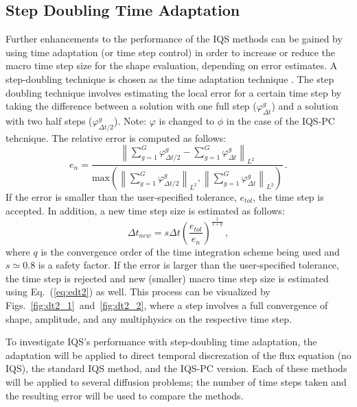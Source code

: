 \documentclass{elsarticle}
\newcommand{\eqt}[1]{Eq.~(\ref{#1})}                     %
\newcommand{\figs}[2]{Figs.~\ref{#1}~and~\ref{#2}}		%
\newcommand{\iqspc}{IQS-PC\xspace}
\newcommand{\be}{\begin{equation}}
\newcommand{\ee}{\end{equation}}
\newcommand{\norm}[1]{\left\lVert#1\right\rVert_{L^2}}
\begin{document}
\subsection{Step Doubling Time Adaptation}

Further enhancements to the performance of the IQS methods can be gained by using time adaptation 
(or time step control) in order to increase or reduce the macro time step size for the shape evaluation, 
depending on error estimates. A step-doubling technique is chosen as the time adaptation technique \cite{NumC}. 
The step doubling technique involves estimating the local error for a certain time step by taking the 
difference between a solution with one full step ($\varphi^g_{\Delta t}$) and a solution with two half steps 
($\varphi^g_{\Delta t/2}$). Note: $\varphi$ is changed to $\phi$ in the case of the \iqspc tehcnique.
%
The relative error is computed as follows:
\be
e_n = \frac{\norm{\sum_{g=1}^G\varphi^g_{\Delta t/2} - \sum_{g=1}^G\varphi^g_{\Delta t}}}{\text{max}\left(\norm{\sum_{g=1}^G\varphi^g_{\Delta t/2}},\norm{\sum_{g=1}^G\varphi^g_{\Delta t}}\right)} \,.
\label{eq:edt2}
\ee
If the error is smaller than the user-specified tolerance, $e_{tol}$, the time step is accepted. In addition, a new time step size is estimated as follows:
\be
\Delta t_{new} = s \Delta t \left(\frac{e_{tol}}{e_n}\right)^{\frac{1}{1+q}} \,,
\label{eq:dt2}
\ee
where $q$ is the convergence order of the time integration scheme being used and $s\simeq 0.8$ is a safety factor. 
If the error is larger than the user-specified tolerance, the time step is rejected and new (smaller) macro time 
step size is estimated using \eqt{eq:edt2} as well. This process can be visualized by \figs{fig:dt2_1}{fig:dt2_2},
where a step involves a full convergence of shape, amplitude, and any multiphysics on the respective time step.

To investigate IQS's performance with step-doubling time adaptation, the adaptation will be applied to 
direct temporal discrezation of the flux equation (no IQS), the standard IQS method, and the \iqspc version. 
Each of these methods will be applied to several diffusion problems; the number of time steps taken and 
the resulting error will be used to compare the methods.
\end{document}
